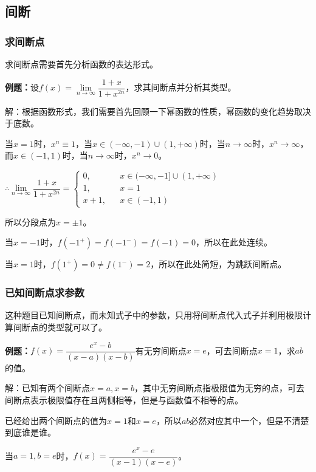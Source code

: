\subsection{间断}

\subsubsection{求间断点}

求间断点需要首先分析函数的表达形式。

\textbf{例题：}设$f(x)=\lim\limits_{n\to\infty}\dfrac{1+x}{1+x^{2n}}$，求其间断点并分析其类型。

解：根据函数形式，我们需要首先回顾一下幂函数的性质，幂函数的变化趋势取决于底数。

当$x=1$时，$x^n\equiv 1$，当$x\in(-\infty,-1)\cup(1,+\infty)$时，当$n\to\infty$时，$x^n\to\infty$，而$x\in(-1,1)$时，当$n\to\infty$时，$x^n\to 0$。

$\therefore\lim\limits_{n\to\infty}\dfrac{1+x}{1+x^{2n}}=\left\{\begin{array}{lcl}
        0,   &  & x\in(-\infty,-1]\cup(1,+\infty) \\
        1,   &  & x=1                                        \\
        x+1, &  & x\in(-1,1)
    \end{array}
    \right.$

所以分段点为$x=\pm 1$。

当$x=-1$时，$f(-1^+)=f(-1^-)=f(-1)=0$，所以在此处连续。

当$x=1$时，$f(1^+)=0\neq f(1^-)=2$，所以在此处简短，为跳跃间断点。

\subsubsection{已知间断点求参数}

这种题目已知间断点，而未知式子中的参数，只用将间断点代入式子并利用极限计算间断点的类型就可以了。

\textbf{例题：}$f(x)=\dfrac{e^x-b}{(x-a)(x-b)}$有无穷间断点$x=e$，可去间断点$x=1$，求$ab$的值。

解：已知有两个间断点$x=a,x=b$，其中无穷间断点指极限值为无穷的点，可去间断点表示极限值存在且两侧相等，但是与函数值不相等的点。

已经给出两个间断点的值为$x=1$和$x=e$，所以$ab$必然对应其中一个，但是不清楚到底谁是谁。

当$a=1,b=e$时，$f(x)=\dfrac{e^x-e}{(x-1)(x-e)}$。\medskip

